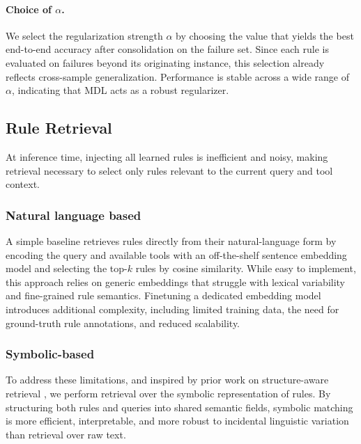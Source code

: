 \documentclass[11pt]{article}
\begin{document}
\paragraph{Choice of $\alpha$.}
We select the regularization strength \( \alpha \) by choosing the value that yields the best
end-to-end accuracy after consolidation on the failure set. Since each rule is evaluated on
failures beyond its originating instance, this selection already reflects cross-sample
generalization. Performance is stable across a wide range of \( \alpha \), indicating that
MDL acts as a robust regularizer.



\subsection{Rule Retrieval}
\label{sec:retrieval}

At inference time, injecting all learned rules is inefficient and noisy, making retrieval
necessary to select only rules relevant to the current query and tool context.


\subsubsection{Natural language based}

A simple baseline retrieves rules directly from their natural-language form by encoding the
query and available tools with an off-the-shelf sentence embedding model and selecting the
top-$k$ rules by cosine similarity. While easy to implement, this approach relies on generic
embeddings that struggle with lexical variability and fine-grained rule semantics. Finetuning
a dedicated embedding model introduces additional complexity, including limited training
data, the need for ground-truth rule annotations, and reduced scalability.

\subsubsection{Symbolic-based}

To address these limitations, and inspired by prior work on structure-aware retrieval
\citep{munikoti2023atlantic,li2023santa}, we perform retrieval over the symbolic
representation of rules. By structuring both rules and queries into shared semantic fields,
symbolic matching is more efficient, interpretable, and more robust to incidental linguistic
variation than retrieval over raw text.
\end{document}
